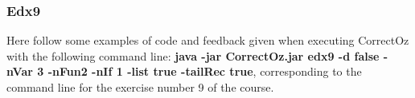 \documentclass[11pt,a4paper,twoside,openright]{report}
\begin{document}
\subsubsection{Edx9}
Here follow some examples of code and feedback given when executing 
CorrectOz with the following command line: \textbf{java -jar CorrectOz.jar edx9 -d 
false -nVar 3 -nFun2 -nIf 1 -list true -tailRec true}, 
corresponding to the command line for the exercise number 9 of the course.


%
%
%
%
%
%
%
%
\end{document}

